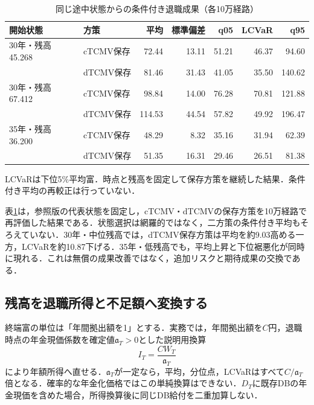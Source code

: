 \documentclass[10pt,a4paper]{article}
\numberwithin{equation}{section}
\numberwithin{table}{section}
\numberwithin{figure}{section}
\theoremstyle{plain}
\theoremstyle{definition}
\begin{document}
\begin{table}[htbp]\centering\footnotesize
\caption{同じ途中状態からの条件付き退職成果（各10万経路）}\label{tab:rolling}
\begin{tabular}{llrrrrr}
\toprule
開始状態 & 方策 & 平均 & 標準偏差 & q05 & LCVaR & q95 \\ \midrule
30年・残高45.268 & cTCMV保存 & 72.44 & 13.11 & 51.21 & 46.37 & 94.60 \\
 & dTCMV保存 & 81.46 & 31.43 & 41.05 & 35.50 & 140.62 \\
30年・残高67.412 & cTCMV保存 & 98.84 & 14.00 & 76.28 & 70.81 & 121.88 \\
 & dTCMV保存 & 114.53 & 44.54 & 57.82 & 49.92 & 196.47 \\
35年・残高36.200 & cTCMV保存 & 48.29 & 8.32 & 35.16 & 31.94 & 62.39 \\
 & dTCMV保存 & 51.35 & 16.31 & 29.46 & 26.51 & 81.38 \\
\bottomrule\end{tabular}
\par\vspace{3pt}\begin{minipage}{0.97\textwidth}\footnotesize LCVaRは下位5\%平均富．時点と残高を固定して保存方策を継続した結果．条件付き平均の再較正は行っていない．\end{minipage}
\end{table}
表\ref{tab:rolling}は，参照版の代表状態を固定し，cTCMV・dTCMVの保存方策を10万経路で再評価した結果である．状態選択は網羅的ではなく，二方策の条件付き平均もそろえていない．30年・中位残高では，dTCMV保存方策は平均を約9.03高める一方，LCVaRを約10.87下げる．35年・低残高でも，平均上昇と下位裾悪化が同時に現れる．これは無償の成果改善ではなく，追加リスクと期待成果の交換である．

\subsection{残高を退職所得と不足額へ変換する}
終端富の単位は「年間拠出額を1」とする．実務では，年間拠出額を$C$円，退職時点の年金現価係数を確定値$\mathfrak a_T>0$とした説明用換算
\begin{equation}
I_T=\frac{CW_T}{\mathfrak a_T}
\label{eq:income}
\end{equation}
により年額所得へ直せる．$\mathfrak a_T$が一定なら，平均，分位点，LCVaRはすべて$C/\mathfrak a_T$倍となる．確率的な年金化価格ではこの単純換算はできない．$D_T$に既存DBの年金現価を含めた場合，所得換算後に同じDB給付を二重加算しない．
\end{document}
